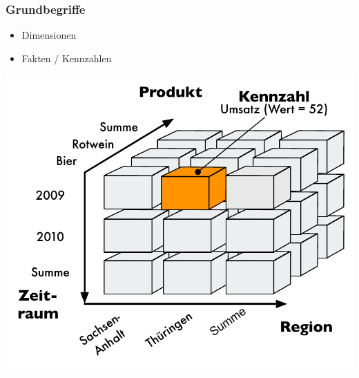 

    \begin{frame}

        \frametitle{Grundbegriffe}
        \begin{itemize}
            \item Dimensionen
            \item Fakten / Kennzahlen
        \end{itemize}
        \begin{center}
        \includegraphics[height=0.8\textAreaHeight]{fig6/Wuerfel.pdf}
        \end{center}

        \end{frame}


